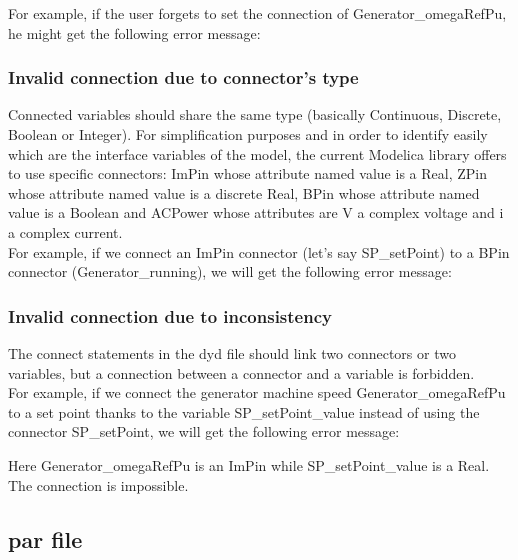 \documentclass[a4paper, 12pt]{report}
\begin{document}
For example, if the user forgets to set the connection of Generator\_omegaRefPu, he might get the following error message:



\subsubsection{Invalid connection due to connector's type}

Connected variables should share the same type (basically  Continuous, Discrete, Boolean or Integer). For simplification purposes and in order to identify easily which are the interface variables of the model, the current \Dynawo Modelica library offers to use specific connectors: ImPin whose attribute named value is a Real, ZPin whose attribute named value is a discrete Real, BPin whose attribute named value is a Boolean and ACPower whose attributes are V a complex voltage and i a complex current. \\

For example, if we connect an ImPin connector (let's say SP\_setPoint) to a BPin connector (Generator\_running), we will get the following error message:



\subsubsection{Invalid connection due to inconsistency}

The connect statements in the dyd file should link two connectors or two variables, but a connection between a connector and a variable is forbidden. \\

For example, if we connect the generator machine speed Generator\_omegaRefPu to a set point thanks to the variable SP\_setPoint\_value instead of using the connector SP\_setPoint, we will get the following error message:



Here Generator\_omegaRefPu is an ImPin while SP\_setPoint\_value is a Real. The connection is impossible.

\subsection{par file}
\end{document}
